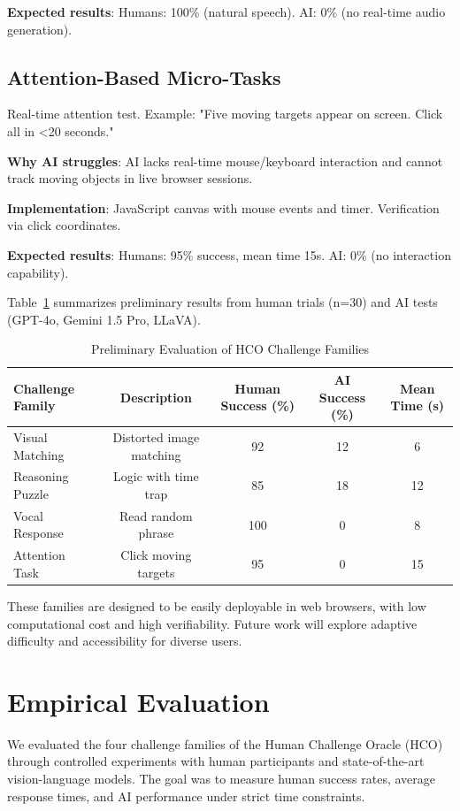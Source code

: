 \documentclass[sigconf,nonacm]{acmart}
\begin{document}
\textbf{Expected results}: Humans: 100\% (natural speech). AI: 0\% (no real-time audio generation).

\subsection{Attention-Based Micro-Tasks}

Real-time attention test. Example: "Five moving targets appear on screen. Click all in <20 seconds."

\textbf{Why AI struggles}: AI lacks real-time mouse/keyboard interaction and cannot track moving objects in live browser sessions.

\textbf{Implementation}: JavaScript canvas with mouse events and timer. Verification via click coordinates.

\textbf{Expected results}: Humans: 95\% success, mean time 15s. AI: 0\% (no interaction capability).

Table~\ref{tab:challenge-results} summarizes preliminary results from human trials (n=30) and AI tests (GPT-4o, Gemini 1.5 Pro, LLaVA).

\begin{table}[t]
	\centering
	\caption{Preliminary Evaluation of HCO Challenge Families}
	\label{tab:challenge-results}
	\begin{tabular}{lcccc}
		\toprule
		Challenge Family & Description & Human Success (\%) & AI Success (\%) & Mean Time (s) \\
		\midrule
		Visual Matching & Distorted image matching & 92 & 12 & 6 \\
		Reasoning Puzzle & Logic with time trap & 85 & 18 & 12 \\
		Vocal Response & Read random phrase & 100 & 0 & 8 \\
		Attention Task & Click moving targets & 95 & 0 & 15 \\
		\bottomrule
	\end{tabular}
\end{table}

These families are designed to be easily deployable in web browsers, with low computational cost and high verifiability. Future work will explore adaptive difficulty and accessibility for diverse users.

\section{Empirical Evaluation}

We evaluated the four challenge families of the Human Challenge Oracle (HCO) through controlled experiments with human participants and state-of-the-art vision-language models. The goal was to measure human success rates, average response times, and AI performance under strict time constraints.
\end{document}
